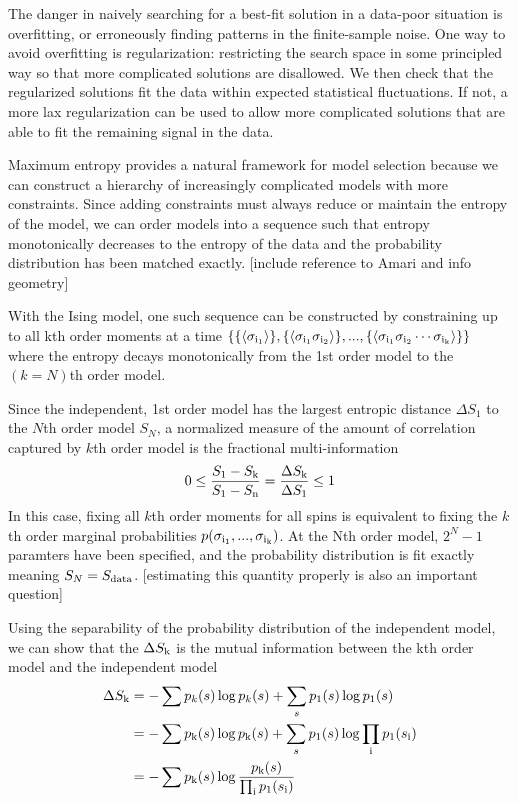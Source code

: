 \documentclass[aps,prl,twocolumn]{revtex4-1}
\begin{document}
The danger in naively searching for a best-fit solution in a data-poor situation
is overfitting, or erroneously finding patterns in the finite-sample noise.
One way to avoid overfitting is regularization:
restricting the search space in some principled way so that more complicated
solutions are disallowed.  We then check that the regularized solutions fit the
data within expected statistical fluctuations.  If not, a more lax regularization
can be used to allow more complicated solutions that are able to fit the
remaining signal in the data.

Maximum entropy provides a natural framework for model selection because we can construct a hierarchy of increasingly complicated models with more constraints. Since adding constraints must always reduce or maintain the entropy of the model, we can order models into a sequence such that entropy monotonically decreases to the entropy of the data and the probability distribution has been matched exactly. [include reference to Amari and info geometry]

With the Ising model, one such sequence can be constructed by constraining up to all kth order moments at a time $\left\{ \{\left<\sigma_{\rm i_1}\right>\},\{\left<\sigma_{\rm i_1}\sigma_{\rm i_2}\right>\},...,\{\left<\sigma_{\rm i_1}\sigma_{\rm i_2}\cdots\sigma_{\rm i_k}\right>\}\right\}$ where the entropy decays monotonically from the 1st order model to the $(k=N)$th order model. 

Since the independent, 1st order model has the largest entropic distance $\Delta S_1$ to the $N$th order model $S_N$, a normalized measure of the amount of correlation captured by $k$th order model is the fractional multi-information
\begin{align}
	0\leq \frac{S_1 - S_{\rm k}}{S_{\rm 1}-S_{\rm n}} = \frac{\Delta S_{\rm k}}{\Delta S_{\rm 1}} \leq 1
\end{align}
In this case, fixing all $k$th order moments for all spins is equivalent to fixing the $k$th order marginal probabilities $p(\sigma_{\rm i_1},...,\sigma_{\rm i_k})$. At the Nth order model, $2^N-1$ paramters have been specified, and the probability distribution is fit exactly meaning $S_N = S_{\rm data}$. [estimating this quantity properly is also an important question]

Using the separability of the probability distribution of the independent model, we can show that the $\Delta S_{\rm k}$ is the mutual information between the kth order model and the independent model
\begin{align}
	\Delta S_{\rm k} &= -\sum p_k(s)\log p_k(s) + \sum_s p_1(s) \log p_1(s) \\
		&= -\sum p_{\rm k}(s)\log p_{\rm k}(s) + \sum_s p_1(s) \log \prod_{\rm i} p_1(s_{\rm i})\\
		&= -\sum p_{\rm k}(s)\log \frac{p_{\rm k}(s)}{\prod_{\rm i} p_1(s_{\rm i})}
\end{align}
\end{document}
